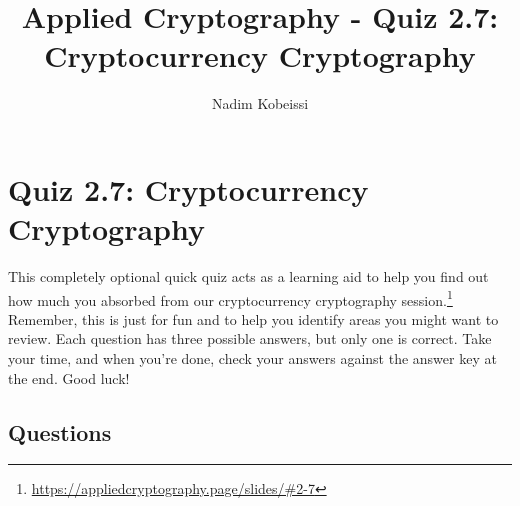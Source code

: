 \documentclass[10pt,a4paper,american]{exam}
\title{Applied Cryptography - Quiz 2.7: Cryptocurrency Cryptography}
\author{Nadim Kobeissi}
\begin{document}
\classhandoutheader
\section*{Quiz 2.7: Cryptocurrency Cryptography}

\begin{tcolorbox}[colframe=OliveGreen!30!white,colback=OliveGreen!5!white]
	This completely optional quick quiz acts as a learning aid to help you find out how much you absorbed from our cryptocurrency cryptography session.\footnote{\url{https://appliedcryptography.page/slides/\#2-7}} Remember, this is just for fun and to help you identify areas you might want to review. Each question has three possible answers, but only one is correct. Take your time, and when you're done, check your answers against the answer key at the end. Good luck!
\end{tcolorbox}

\subsection*{Questions}
\end{document}

